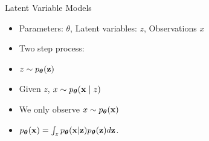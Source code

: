 \documentclass{beamer}
\begin{document}
\begin{frame}{Latent Variable Models}{}
    \begin{itemize}
        \item{
            Parameters: $\theta$, Latent variables: $z$, Observations $x$
        }
        \item{
            Two step process:
            \begin{center}
            \end{center}
        }
        \item{
            $z \sim p_{\boldsymbol{\theta}}(\mathbf{z})$
        }
        \item{
            Given $z$, $x \sim p_{\boldsymbol{\theta}}(\mathbf{x} \mid z)$
        }
        \item{
            We only observe $x \sim p_{\boldsymbol{\theta}}(\mathbf{x})$
        }
        \item{
            $p_{\boldsymbol{\theta}}(\mathbf{x}) = \int_{z} p_{\boldsymbol{\theta}}(\mathbf{x}|\mathbf{z}) p_{\boldsymbol{\theta}}(\mathbf{z}) d\mathbf{z}$.
        }
    \end{itemize}

\end{frame}



\end{document}

